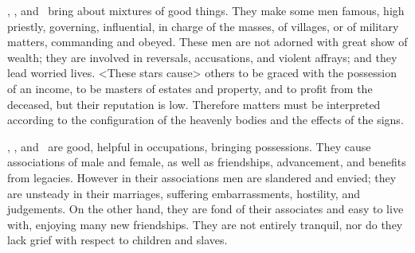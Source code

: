 \Saturn, \Jupiter, and \Mars\, bring about mixtures of good things. They make some men famous, high priestly, governing, influential, in charge of the masses, of villages, or of military matters, commanding and obeyed. These men are not adorned with great show of wealth; they are involved in reversals, accusations, and violent affrays; and they lead worried lives. <These stars cause> others to be graced with the possession of an income, to be masters of estates and property, and to profit from the deceased, but their reputation is low. \mndl Therefore matters must be interpreted according to the configuration of the heavenly bodies and the effects of the signs.

\Saturn, \Jupiter, and \Venus\, are good, helpful in occupations, bringing possessions. They cause associations of male and female, as well as friendships, advancement, and benefits from legacies. However in their associations men are slandered and envied; they are unsteady in their marriages, suffering embarrassments, hostility, and judgements. On the other hand, they are fond of their associates and easy to live with, enjoying many new friendships. They are not entirely tranquil, nor do they lack grief with respect to children and slaves.

